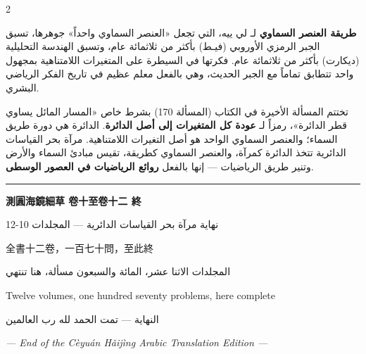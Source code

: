 \documentclass[11pt,a4paper]{article}
\newcommand{\ar}[1]{\arabicfont\beginR #1\endR}
\newcommand{\longline}{\noindent\rule{\textwidth}{0.4pt}}
\newcommand{\arnote}[1]{\textcolor{arabicblue}{\ar{#1}}}
\begin{document}
\begin{paracol}{2}
\begin{rightcolumn}
\begin{framed}
\arnote{\textbf{طريقة العنصر السماوي} لـ لي ييه، التي تجعل «العنصر السماوي واحداً» جوهرها، تسبق الجبر الرمزي الأوروبي (فيـط) بأكثر من ثلاثمائة عام، وتسبق الهندسة التحليلية (ديكارت) بأكثر من ثلاثمائة عام. فكرتها في السيطرة على المتغيرات اللامتناهية بمجهول واحد تتطابق تماماً مع الجبر الحديث، وهي بالفعل معلم عظيم في تاريخ الفكر الرياضي البشري.}

\arnote{تختتم المسألة الأخيرة في الكتاب (المسألة 170) بشرط خاص «المسار المائل يساوي قطر الدائرة»، رمزاً لـ \textbf{عودة كل المتغيرات إلى أصل الدائرة}. الدائرة هي دورة طريق السماء؛ والعنصر السماوي الواحد هو أصل التغيرات اللامتناهية. مرآة بحر القياسات الدائرية تتخذ الدائرة كمرآة، والعنصر السماوي كطريقة، تقيس مبادئ السماء والأرض وتنير طريق الرياضيات — إنها بالفعل \textbf{روائع الرياضيات في العصور الوسطى}.}
\end{framed}
\end{rightcolumn}

\end{paracol}

\vspace{1cm}
\begin{center}
\longline

\vspace{0.5cm}
{\Large\bfseries 測圓海鏡細草 卷十至卷十二 終}

\vspace{0.3cm}
{\large\ar{نهاية مرآة بحر القياسات الدائرية — المجلدات 10-12}}

\vspace{0.5cm}
{\small\color{notecolor} 全書十二卷，一百七十問，至此終}

\vspace{0.2cm}
{\small\ar{المجلدات الاثنا عشر، المائة والسبعون مسألة، هنا تنتهي}}

\vspace{0.5cm}
{\small\color{notecolor} Twelve volumes, one hundred seventy problems, here complete}

\vspace{0.5cm}
{\footnotesize\color{arabicblue}\ar{النهاية — تمت الحمد لله رب العالمين}}
\end{center}

\vfill
\begin{center}
\textit{--- End of the C\`{e}yu\'{a}n H\v{a}ij\`{i}ng Arabic Translation Edition ---}
\end{center}
\end{document}
